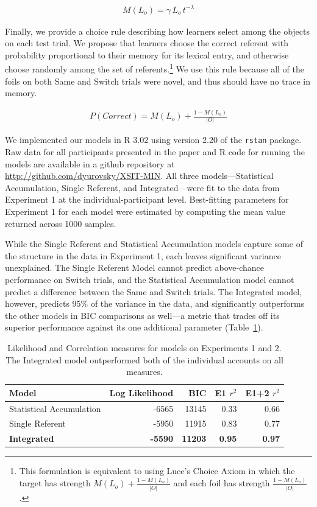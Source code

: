 \documentclass[man,floatsintext]{apa6}
\begin{document}
\begin{align}
M(L_{o}) = \gamma \, L_{o} \, t^{-\lambda}
\end{align}

Finally, we provide a choice rule describing how learners select among the objects on each test trial. We propose that learners choose the correct referent with probability proportional to their memory for its lexical entry, and otherwise choose randomly among the set of referents.\footnote{This formulation is equivalent to using Luce's Choice Axiom \cite{Luce1959} in which the target has strength  $M(L_{o}) + \frac{1-M(L_{o})}{|O|}$ and each foil has strength $\frac{1-M(L_{o})}{|O|}$.} We use this rule because all of the foils on both Same and Switch trials were novel, and thus should have no trace in memory.

\begin{align}
P(Correct) = M(L_{o}) + \frac{1-M(L_{o})}{|O|}
\end{align}

We implemented our models in R 3.02 using version 2.20 of the \texttt{rstan} package. Raw data for all participants presented in the paper and R code for running the models are available in a github repository at \url{http://github.com/dyurovsky/XSIT-MIN}. All three models---Statistical Accumulation, Single Referent, and Integrated---were fit to the data from Experiment 1 at the individual-participant level. Best-fitting parameters for Experiment 1 for each model were estimated by computing the mean value returned across 1000 samples.

While the Single Referent and Statistical Accumulation models capture some of the structure in the data in Experiment 1, each leaves significant variance unexplained. The Single Referent Model cannot predict above-chance performance on Switch trials, and the Statistical Accumulation model cannot predict a difference between the Same and Switch trials. The Integrated model, however, predicts 95\% of the variance in the data, and significantly outperforms the other models in BIC comparisons as well---a metric that trades off its superior performance against its one additional parameter (Table~\ref{tab:model}).


\begin{table}
\begin{center}
\begin{tabular}{lrrrr}
  Model & Log Likelihood & BIC & E1 $r^{2}$ & E1+2 $r^{2}$ \\ 
  \hline
  Statistical Accumulation & -6565 & 13145 & 0.33 & 0.66 \\ 
  Single Referent & -5950 & 11915 & 0.83 & 0.77 \\ 
  \textbf{Integrated} & \textbf{-5590} & \textbf{11203} & \textbf{0.95} & \textbf{0.97} \\ 
  \hline
\end{tabular}
\end{center}
\caption{\label{tab:model}Likelihood and Correlation measures for models on Experiments 1 and 2. The Integrated model outperformed both of the individual accounts on all measures.}
\end{table}
\end{document}
